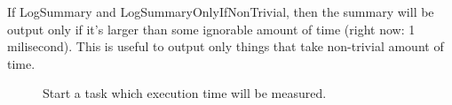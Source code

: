 \documentclass{report}
\begin{document}
\begin{list}{}
If LogSummary and LogSummaryOnlyIfNonTrivial, then the summary will be output only if it's larger than some ignorable amount of time (right now: 1 milisecond). This is useful to output only things that take non{-}trivial amount of time.

\item[\textbf{See also}]
\begin{description}
\item[\begin{ttfamily}Start\end{ttfamily}(\ref{ok_nested_2.TCastleProfiler-Start})] 
Start a task which execution time will be measured.
\end{description}


\end{list}
\end{document}
